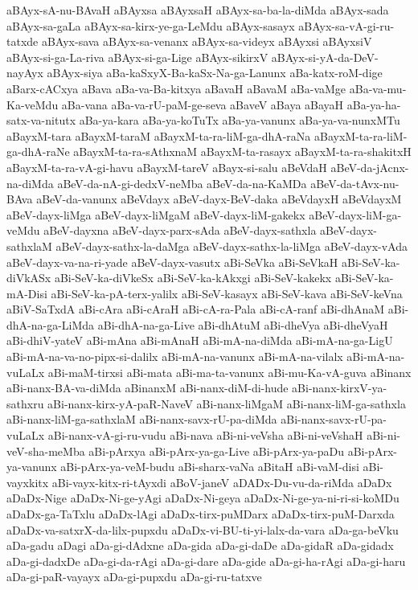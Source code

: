 {aBAyx-sA-nu-BAvaH
aBAyxsa
aBAyxsaH
aBAyx-sa-ba-la-diMda
aBAyx-sada
aBAyx-sa-gaLa
aBAyx-sa-kirx-ye-ga-LeMdu
aBAyx-sasayx
aBAyx-sa-vA-gi-ru-tatxde
aBAyx-sava
aBAyx-sa-venanx
aBAyx-sa-videyx
aBAyxsi
aBAyxsiV
aBAyx-si-ga-La-riva
aBAyx-si-ga-Lige
aBAyx-sikirxV
aBAyx-si-yA-da-DeV-nayAyx
aBAyx-siya
aBa-kaSxyX-Ba-kaSx-Na-ga-Lanunx
aBa-katx-roM-dige
aBarx-cACxya
aBava
aBa-va-Ba-kitxya
aBavaH
aBavaM
aBa-vaMge
aBa-va-mu-Ka-veMdu
aBa-vana
aBa-va-rU-paM-ge-seva
aBaveV
aBaya
aBayaH
aBa-ya-ha-satx-va-nitutx
aBa-ya-kara
aBa-ya-koTuTx
aBa-ya-vanunx
aBa-ya-va-nunxMTu
aBayxM-tara
aBayxM-taraM
aBayxM-ta-ra-liM-ga-dhA-raNa
aBayxM-ta-ra-liM-ga-dhA-raNe
aBayxM-ta-ra-sAthxnaM
aBayxM-ta-rasayx
aBayxM-ta-ra-shakitxH
aBayxM-ta-ra-vA-gi-havu
aBayxM-tareV
aBayx-si-salu
aBeVdaH
aBeV-da-jAcnx-na-diMda
aBeV-da-nA-gi-dedxV-neMba
aBeV-da-na-KaMDa
aBeV-da-tAvx-nu-BAva
aBeV-da-vanunx
aBeVdayx
aBeV-dayx-BeV-daka
aBeVdayxH
aBeVdayxM
aBeV-dayx-liMga
aBeV-dayx-liMgaM
aBeV-dayx-liM-gakekx
aBeV-dayx-liM-ga-veMdu
aBeV-dayxna
aBeV-dayx-parx-sAda
aBeV-dayx-sathxla
aBeV-dayx-sathxlaM
aBeV-dayx-sathx-la-daMga
aBeV-dayx-sathx-la-liMga
aBeV-dayx-vAda
aBeV-dayx-va-na-ri-yade
aBeV-dayx-vasutx
aBi-SeVka
aBi-SeVkaH
aBi-SeV-ka-diVkASx
aBi-SeV-ka-diVkeSx
aBi-SeV-ka-kAkxgi
aBi-SeV-kakekx
aBi-SeV-ka-mA-Disi
aBi-SeV-ka-pA-terx-yalilx
aBi-SeV-kasayx
aBi-SeV-kava
aBi-SeV-keVna
aBiV-SaTxdA
aBi-cAra
aBi-cAraH
aBi-cA-ra-Pala
aBi-cA-ranf
aBi-dhAnaM
aBi-dhA-na-ga-LiMda
aBi-dhA-na-ga-Live
aBi-dhAtuM
aBi-dheVya
aBi-dheVyaH
aBi-dhiV-yateV
aBi-mAna
aBi-mAnaH
aBi-mA-na-diMda
aBi-mA-na-ga-LigU
aBi-mA-na-va-no-pipx-si-dalilx
aBi-mA-na-vanunx
aBi-mA-na-vilalx
aBi-mA-na-vuLaLx
aBi-maM-tirxsi
aBi-mata
aBi-ma-ta-vanunx
aBi-mu-Ka-vA-guva
aBinanx
aBi-nanx-BA-va-diMda
aBinanxM
aBi-nanx-diM-di-hude
aBi-nanx-kirxV-ya-sathxru
aBi-nanx-kirx-yA-paR-NaveV
aBi-nanx-liMgaM
aBi-nanx-liM-ga-sathxla
aBi-nanx-liM-ga-sathxlaM
aBi-nanx-savx-rU-pa-diMda
aBi-nanx-savx-rU-pa-vuLaLx
aBi-nanx-vA-gi-ru-vudu
aBi-nava
aBi-ni-veVsha
aBi-ni-veVshaH
aBi-ni-veV-sha-meMba
aBi-pArxya
aBi-pArx-ya-ga-Live
aBi-pArx-ya-paDu
aBi-pArx-ya-vanunx
aBi-pArx-ya-veM-budu
aBi-sharx-vaNa
aBitaH
aBi-vaM-disi
aBi-vayxkitx
aBi-vayx-kitx-ri-tAyxdi
aBoV-janeV
aDADx-Du-vu-da-riMda
aDaDx
aDaDx-Nige
aDaDx-Ni-ge-yAgi
aDaDx-Ni-geya
aDaDx-Ni-ge-ya-ni-ri-si-koMDu
aDaDx-ga-TaTxlu
aDaDx-lAgi
aDaDx-tirx-puMDarx
aDaDx-tirx-puM-Darxda
aDaDx-va-satxrX-da-lilx-pupxdu
aDaDx-vi-BU-ti-yi-lalx-da-vara
aDa-ga-beVku
aDa-gadu
aDagi
aDa-gi-dAdxne
aDa-gida
aDa-gi-daDe
aDa-gidaR
aDa-gidadx
aDa-gi-dadxDe
aDa-gi-da-rAgi
aDa-gi-dare
aDa-gide
aDa-gi-ha-rAgi
aDa-gi-haru
aDa-gi-paR-vayayx
aDa-gi-pupxdu
aDa-gi-ru-tatxve
}
